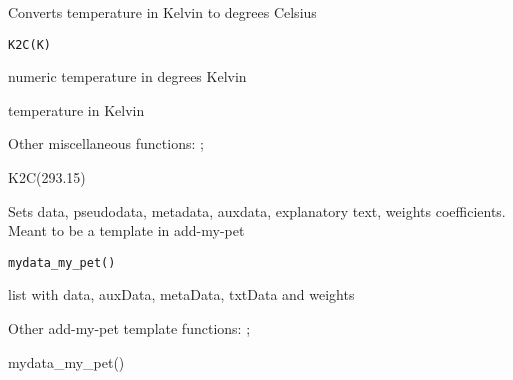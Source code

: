 \documentclass[a4paper]{book}
\begin{document}
%
\begin{Description}\relax
Converts temperature in Kelvin to degrees Celsius
\end{Description}
%
\begin{Usage}
\begin{verbatim}
K2C(K)
\end{verbatim}
\end{Usage}
%
\begin{Arguments}
\begin{ldescription}
\item[\code{K}] numeric temperature in degrees Kelvin
\end{ldescription}
\end{Arguments}
%
\begin{Value}
temperature in Kelvin
\end{Value}
%
\begin{SeeAlso}\relax
Other miscellaneous functions: ;
\end{SeeAlso}
%
\begin{Examples}
\begin{ExampleCode}
K2C(293.15)
\end{ExampleCode}
\end{Examples}
%
\begin{Description}\relax
Sets data, pseudodata, metadata, auxdata, explanatory text, weights coefficients. Meant to be a template in add-my-pet
\end{Description}
%
\begin{Usage}
\begin{verbatim}
mydata_my_pet()
\end{verbatim}
\end{Usage}
%
\begin{Value}
list with data, auxData, metaData, txtData and weights
\end{Value}
%
\begin{SeeAlso}\relax
Other add-my-pet template functions: ;
\end{SeeAlso}
%
\begin{Examples}
\begin{ExampleCode}
mydata_my_pet()
\end{ExampleCode}
\end{Examples}
\end{document}

